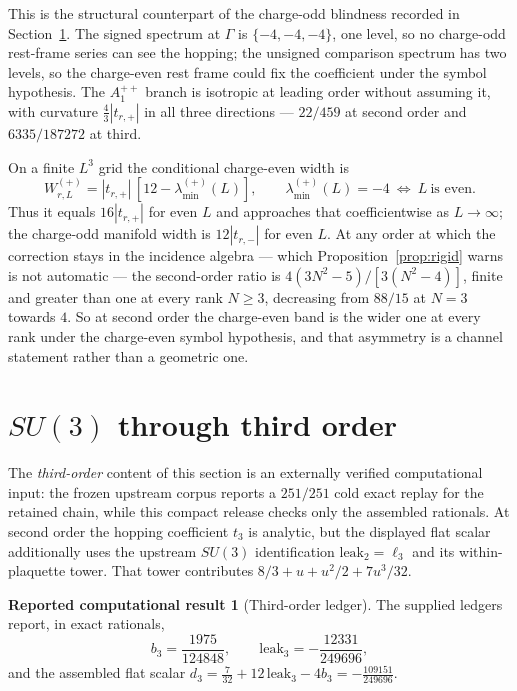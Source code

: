 \documentclass[11pt]{article}
\theoremstyle{plain}
\theoremstyle{definition}
\newtheorem{reported}[theorem]{Reported computational result}
\theoremstyle{remark}
\newcommand{\chk}[1]{}
\begin{document}
This is the structural counterpart of the charge-odd blindness recorded in
Section~\ref{sec:su3}. The signed spectrum at $\Gamma$ is $\{-4,-4,-4\}$, one
level, so no charge-odd rest-frame series can see the hopping; the unsigned
comparison spectrum has two levels, so the charge-even rest frame could fix
the coefficient under the symbol hypothesis. The $A_1^{++}$
branch is isotropic at leading order without assuming it, with curvature
$\tfrac43|t_{r,+}|$ in all three directions --- $22/459$ at second order and
$6335/187272$ at third.
\chk{the C-even curvature is (4/3)|t\_+| at both orders, and isotropic}

On a finite $L^3$ grid the conditional charge-even width is
\[
 W^{(+)}_{r,L}=|t_{r,+}|\,[12-\lambda_{\min}^{(+)}(L)],
 \qquad \lambda_{\min}^{(+)}(L)=-4\ \Longleftrightarrow\ L\ \text{is even}.
\]
Thus it equals $16|t_{r,+}|$ for even $L$ and approaches that coefficientwise
as $L\to\infty$; the charge-odd manifold width is $12|t_{r,-}|$ for even $L$.
At any order at which the correction
stays in the incidence algebra --- which Proposition~\ref{prop:rigid} warns is
not automatic --- the second-order ratio is $4(3N^2-5)/[3(N^2-4)]$, finite and
greater than one at every rank $N\ge3$, decreasing from $88/15$ at $N=3$
towards $4$. So at second order the charge-even band is the wider one at every
rank under the charge-even symbol hypothesis, and that asymmetry is a channel
statement rather than a geometric one.
\chk{the C-even bandwidth is 16|t\_+| at every order; the C-odd manifold width is 12|t\_-|}
\chk{at N = 2 the C-odd hopping vanishes and the C-even one does not}

\section{\texorpdfstring{$SU(3)$}{SU(3)} through third order}
\label{sec:su3}

The \emph{third-order} content of this section is an externally verified
computational input: the frozen upstream corpus reports a $251/251$ cold exact
replay for the retained chain, while this compact release checks only the
assembled rationals. At second order the hopping coefficient $t_3$ is analytic,
but the displayed flat scalar additionally uses the upstream $SU(3)$
identification $\mathrm{leak}_2=\ell_3$ and its within-plaquette tower. That
tower contributes $8/3+u+u^2/2+7u^3/32$.

\begin{reported}[Third-order ledger]\label{rep:su3}
The supplied ledgers report, in exact rationals,
\[
  b_3=\frac{1975}{124848},\qquad
  \mathrm{leak}_3=-\frac{12331}{249696},
\]
and the assembled flat scalar
$d_3=\tfrac7{32}+12\,\mathrm{leak}_3-4b_3=-\tfrac{109151}{249696}$.
\end{reported}
\chk{d\_3 = 7/32 + 12*leak\_3 - 4*b\_3}
\chk{leak\_3 is assembled from the domino diagonal and the vacuum piece}
\end{document}
